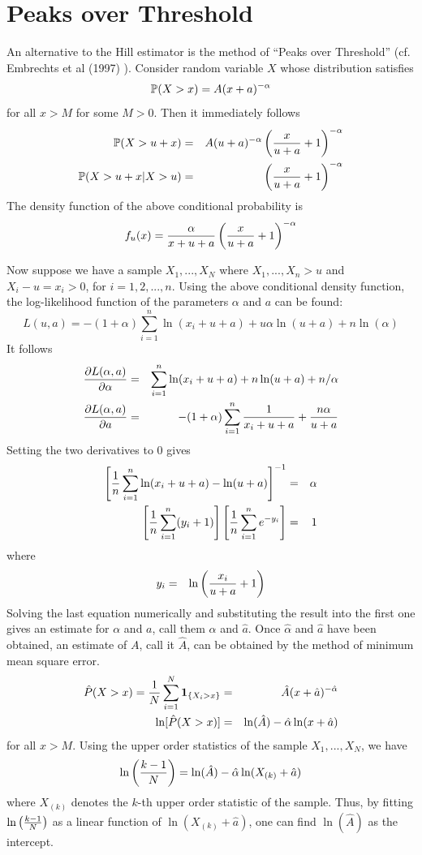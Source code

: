 \documentclass{article}
\begin{document}
\section{Peaks over Threshold}
An alternative to the Hill estimator is the method of ``Peaks over
Threshold'' (cf. Embrechts et al (1997)
\cite{Embrechts1997}). Consider random variable $X$ whose distribution
satisfies 
\[
\P(X > x) = A (x + a)^{-\alpha}
\]
for all $x > M$ for some $M > 0$. Then it immediately follows
\begin{eqnarray*}
  \P(X > u + x)
  &=& A (u + a)^{-\alpha} \left(
  {x \over u + a} + 1
  \right)^{-\alpha} \\
  \P(X > u + x | X > u) &=& \left(
    {x \over u + a} + 1
    \right)^{-\alpha}
\end{eqnarray*}
The density function of the above conditional probability is
\[
f_u(x) = {
  \alpha \over x + u + a
} \left(
{x \over u + a} + 1
\right)^{-\alpha}
\]

Now suppose we have a sample $X_1, ..., X_N$ where $X_1, ..., X_n > u$
and $X_i - u = x_i > 0$, for $i=1,2,...,n$. Using the above
conditional density function, the log-likelihood function of the
parameters $\alpha$ and $a$ can be found:
\[
L(u, a) = -(1 + \alpha) \sum_{i=1}^n \ln(x_i + u + a) +
u \alpha \ln(u + a) + n \ln(\alpha)
\]
It follows
\begin{eqnarray*}
  \pd{L(\alpha, a)}{\alpha} &=& \sum_{i=1}^n \ln(x_i + u + a)
  + n \ln(u + a) + n/\alpha \\
  \pd{L(\alpha, a)}{a} &=&
  -(1 + \alpha) \sum_{i=1}^n {1 \over x_i + u + a}
  + {n \alpha \over u + a}
\end{eqnarray*}
Setting the two derivatives to 0 gives
\begin{eqnarray*}
  \left[
    {1 \over n} \sum_{i=1}^n \ln(x_i + u + a)
    - \ln(u + a)
    \right]^{-1} &=& \alpha\\
  \left[
    {1 \over n} \sum_{i=1}^n (y_i + 1)
    \right] \left[
    {1 \over n} \sum_{i=1}^n e^{-y_i}
    \right] &=& 1
\end{eqnarray*}
where
\begin{eqnarray*}
  y_i &=& \ln\left(
  {x_i \over u + a} + 1
  \right)
\end{eqnarray*}
Solving the last equation numerically and substituting the result into
the first one gives an estimate for $\alpha$ and $a$, call them $\hat
\alpha$ and $\hat a$. Once $\hat \alpha$ and $\hat a$ have been
obtained, an estimate of $A$, call it $\hat A$, can be obtained by
the method of minimum mean square error.
\begin{eqnarray*}
  \hat P(X > x) = {1 \over N} \sum_{i=1}^N \1{X_i > x}
  &=& \hat A (x + \hat a)^{-\hat \alpha} \\
  \ln[\hat P(X > x)] &=& \ln(\hat A) - \hat \alpha \ln(x + \hat a)
\end{eqnarray*}
for all $x > M$. Using the upper order statistics of the
sample $X_1, ..., X_N$, we have
\[
\ln\left({k-1 \over N}\right)
=
\ln(\hat A) - \hat \alpha \ln(X_{(k)} + \hat a)
\]
where $X_{(k)}$ denotes the $k$-th upper order statistic of the
sample. Thus, by fitting $\ln\left({k-1 \over N}\right)$ as a linear
function of $\ln(X_{(k)} + \hat a)$, one can find $\ln(\hat A)$ as the
intercept.
\end{document}
